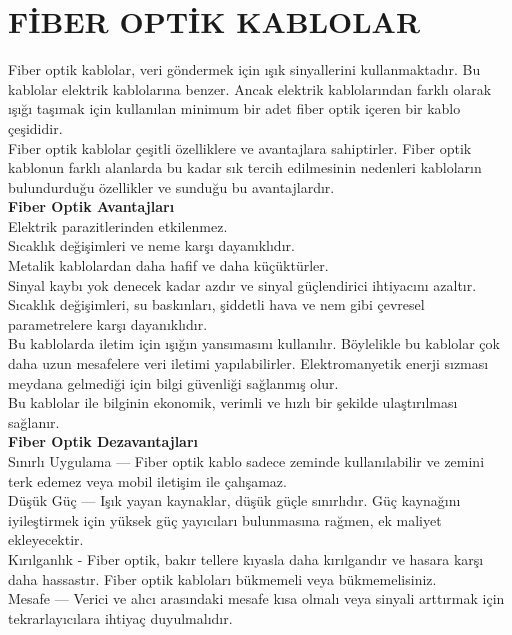 \section*{FİBER OPTİK KABLOLAR}
Fiber optik kablolar, veri göndermek için ışık sinyallerini kullanmaktadır. Bu kablolar elektrik kablolarına benzer. Ancak elektrik kablolarından farklı olarak ışığı taşımak için kullanılan minimum bir adet fiber optik içeren bir kablo çeşididir.\\
Fiber optik kablolar çeşitli özelliklere ve avantajlara sahiptirler. Fiber optik kablonun farklı alanlarda  bu kadar sık tercih edilmesinin nedenleri kabloların bulundurduğu özellikler ve sunduğu bu avantajlardır. \\
\textbf{Fiber Optik Avantajları}\\
Elektrik parazitlerinden etkilenmez.\\
Sıcaklık değişimleri ve neme karşı dayanıklıdır.\\
Metalik kablolardan daha hafif ve daha küçüktürler.\\
Sinyal kaybı yok denecek kadar azdır ve sinyal güçlendirici ihtiyacını azaltır.\\
Sıcaklık değişimleri, su baskınları, şiddetli hava ve nem gibi çevresel parametrelere karşı dayanıklıdır.\\
Bu kablolarda iletim için ışığın yansımasını kullanılır. Böylelikle bu kablolar çok daha uzun mesafelere veri iletimi yapılabilirler.
Elektromanyetik enerji sızması meydana gelmediği için bilgi güvenliği sağlanmış olur.\\
Bu kablolar ile bilginin ekonomik, verimli ve hızlı bir şekilde ulaştırılması sağlanır.\\
\textbf{Fiber Optik Dezavantajları}\\
Sınırlı Uygulama — Fiber optik kablo sadece zeminde kullanılabilir ve zemini terk edemez veya mobil iletişim ile çalışamaz.\\
Düşük Güç — Işık yayan kaynaklar, düşük güçle sınırlıdır. Güç kaynağını iyileştirmek için yüksek güç yayıcıları bulunmasına rağmen, ek maliyet ekleyecektir.\\
Kırılganlık - Fiber optik, bakır tellere kıyasla daha kırılgandır ve hasara karşı daha hassastır. Fiber optik kabloları bükmemeli veya bükmemelisiniz.\\
Mesafe — Verici ve alıcı arasındaki mesafe kısa olmalı veya sinyali arttırmak için tekrarlayıcılara ihtiyaç duyulmalıdır.\\


